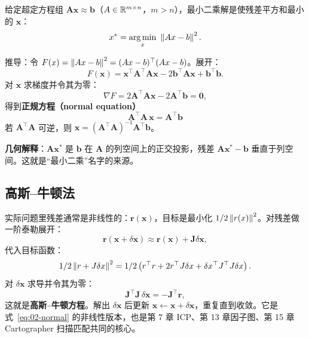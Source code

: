 \begin{definition}[最小二乘]
给定超定方程组 $\bm{A}\bm{x}\approx\bm{b}$（$A\in\mathbb{R}^{m\times n}$，$m>n$），最小二乘解是使残差平方和最小的 $\bm{x}$：
\begin{equation}
\bm{x}^{*}=\argmin_{\bm{x}}\ \norm{\bm{A}\bm{x}-\bm{b}}^{2}.
\end{equation}
\end{definition}

推导：令 $F(x)=\left\lVert Ax-b \right\rVert^{2}=(Ax-b)^{\top}(Ax-b)$。展开：
\begin{equation}
F(\bm{x})=\bm{x}^{\top}\bm{A}^{\top}\bm{A}\bm{x}-2\bm{b}^{\top}\bm{A}\bm{x}+\bm{b}^{\top}\bm{b}.
\end{equation}
对 $\bm{x}$ 求梯度并令其为零：
\begin{equation}
\nabla F=2\bm{A}^{\top}\bm{A}\bm{x}-2\bm{A}^{\top}\bm{b}=\bm{0},
\end{equation}
得到\textbf{正规方程（normal equation）}
\begin{equation}
\boxed{\bm{A}^{\top}\bm{A}\,\bm{x}=\bm{A}^{\top}\bm{b}}
\label{eq:02-normal}
\end{equation}
若 $\bm{A}^{\top}\bm{A}$ 可逆，则 $\bm{x}=(\bm{A}^{\top}\bm{A})^{-1}\bm{A}^{\top}\bm{b}$。

\textbf{几何解释}：$\bm{A}\bm{x}^{*}$ 是 $\bm{b}$ 在 $\bm{A}$ 的列空间上的正交投影，残差 $\bm{A}\bm{x}^{*}-\bm{b}$ 垂直于列空间。这就是“最小二乘”名字的来源。

\subsection{高斯--牛顿法}

实际问题里残差通常是非线性的：$\bm{r}(\bm{x})$，目标是最小化 $1/2\left\lVert r(x) \right\rVert^{2}$。对残差做一阶泰勒展开：
\begin{equation}
\bm{r}(\bm{x}+\delta\bm{x})\approx\bm{r}(\bm{x})+\bm{J}\delta\bm{x},
\end{equation}
代入目标函数：
\begin{equation}
1/2\left\lVert r+J\delta x \right\rVert^{2}
=1/2\left(r^{\top}r+2r^{\top}J\delta x+\delta x^{\top}J^{\top}J\delta x\right).
\end{equation}
对 $\delta\bm{x}$ 求导并令其为零：
\begin{equation}
\bm{J}^{\top}\bm{J}\,\delta\bm{x}=-\bm{J}^{\top}\bm{r},
\label{eq:02-gn}
\end{equation}
这就是\textbf{高斯--牛顿方程}。解出 $\delta\bm{x}$ 后更新 $\bm{x}\leftarrow\bm{x}+\delta\bm{x}$，重复直到收敛。它是式~\eqref{eq:02-normal} 的非线性版本，也是第 7 章 ICP、第 13 章因子图、第 15 章 Cartographer 扫描匹配共同的核心。

